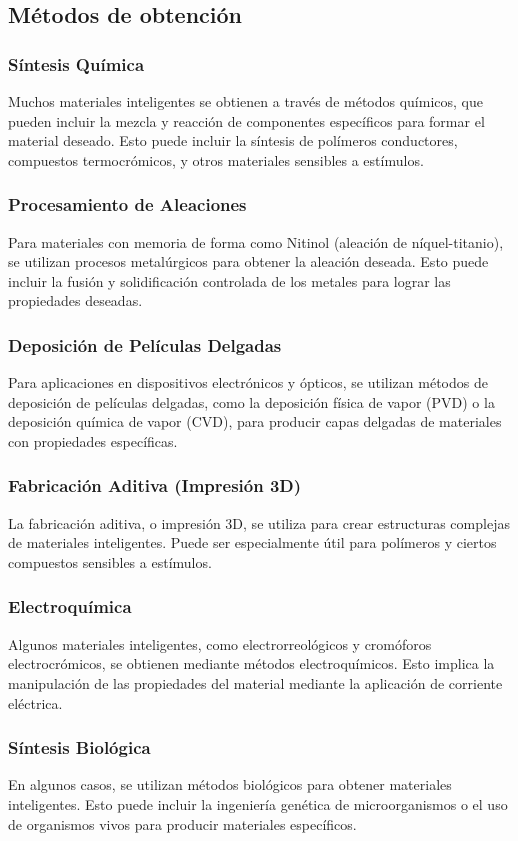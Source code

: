 \subsection{Métodos de obtención}
    \subsubsection{Síntesis Química}
    Muchos materiales inteligentes se obtienen a través de métodos químicos, que pueden incluir la mezcla y reacción de componentes específicos para formar el material deseado. Esto puede incluir la síntesis de polímeros conductores, compuestos termocrómicos, y otros materiales sensibles a estímulos.
    \subsubsection{Procesamiento de Aleaciones}
    Para materiales con memoria de forma como Nitinol (aleación de níquel-titanio), se utilizan procesos metalúrgicos para obtener la aleación deseada. Esto puede incluir la fusión y solidificación controlada de los metales para lograr las propiedades deseadas.
    \subsubsection{Deposición de Películas Delgadas}
    Para aplicaciones en dispositivos electrónicos y ópticos, se utilizan métodos de deposición de películas delgadas, como la deposición física de vapor (PVD) o la deposición química de vapor (CVD), para producir capas delgadas de materiales con propiedades específicas.
    \subsubsection{Fabricación Aditiva (Impresión 3D)}
    La fabricación aditiva, o impresión 3D, se utiliza para crear estructuras complejas de materiales inteligentes. Puede ser especialmente útil para polímeros y ciertos compuestos sensibles a estímulos.
    \subsubsection{Electroquímica}
    Algunos materiales inteligentes, como electrorreológicos y cromóforos electrocrómicos, se obtienen mediante métodos electroquímicos. Esto implica la manipulación de las propiedades del material mediante la aplicación de corriente eléctrica.
    \subsubsection{Síntesis Biológica}
    En algunos casos, se utilizan métodos biológicos para obtener materiales inteligentes. Esto puede incluir la ingeniería genética de microorganismos o el uso de organismos vivos para producir materiales específicos.
